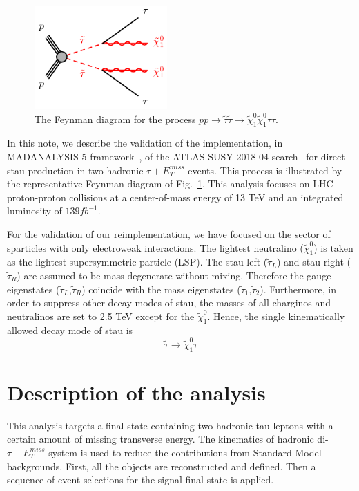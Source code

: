 \documentclass{ws-mpla}
\begin{document}
\begin{figure}[t]
  \centerline{\includegraphics[width=2.0in]{fig_01}}
  \vspace*{8pt}
  \caption{The Feynman diagram for the process $pp\rightarrow\tilde{\tau}\tilde{\tau}\rightarrow\tilde{\chi}^0_1\tilde{\chi}^0_1\tau\tau$.\protect\label{fig:fig_01}}
\end{figure}

In this note, we describe the validation of the implementation, in MADANALYSIS 5 framework~\cite{Conte:2018vmg,Dumont:2014tja,Conte:2014zja,Conte:2012fm}, of the ATLAS-SUSY-2018-04 search~\cite{Aad:2019byo} for direct stau production in two hadronic $\tau +E^{miss}_T$ events. 
This process is illustrated by the representative Feynman diagram of Fig.~\ref{fig:fig_01}. 
This analysis focuses on LHC proton-proton collisions at a center-of-mass energy of 13 TeV and an integrated luminosity of $139 fb^{-1}$.

For the validation of our reimplementation, we have focused on the sector of sparticles with only electroweak interactions. 
The lightest neutralino ($\tilde{\chi}^0_1$) is taken as the lightest supersymmetric particle (LSP). 
The stau-left ($\tilde{\tau}_L$) and stau-right ($\tilde{\tau}_R$) are assumed to be mass degenerate without mixing.  Therefore the gauge eigenstates ($\tilde{\tau}_L$,$\tilde{\tau}_R$) coincide with the mass eigenstates ($\tilde{\tau}_1$,$\tilde{\tau}_2$). 
Furthermore, in order to suppress other decay modes of stau, the masses of all charginos and neutralinos are set to 2.5 TeV except for the $\tilde{\chi}^0_1$. 
Hence, the single kinematically allowed decay mode of stau is 
\begin{equation}
\tilde{\tau}\rightarrow\tilde{\chi}^0_1 \tau 
\end{equation}
 

\section{Description of the analysis}

This analysis targets a final state containing two hadronic tau leptons with a certain amount of missing transverse energy. 
The kinematics of {\color{blue}hadronic} di-$\tau +E^{miss}_T$ system is used to reduce the contributions from Standard Model backgrounds. 
First, all the objects are reconstructed and defined. Then a sequence of event selections for the signal final state is applied.
\end{document}
